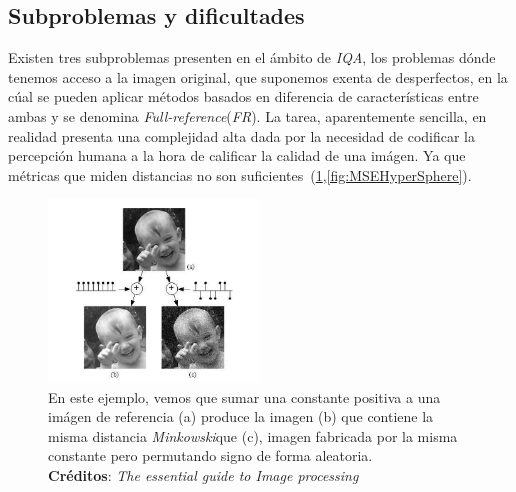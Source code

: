 
\subsection{Subproblemas y dificultades}
Existen tres subproblemas presenten en el ámbito de \emph{IQA}, los problemas 
dónde tenemos acceso a la imagen original, que suponemos exenta de desperfectos, 
en la cúal se pueden aplicar métodos basados en diferencia de características 
entre ambas y se denomina \emph{Full-reference}(\emph{FR}). 
La tarea, aparentemente sencilla, en realidad presenta una complejidad alta dada por 
la necesidad de codificar la percepción humana a la hora de calificar la calidad 
de una imágen. Ya que métricas que miden distancias no son suficientes~(\ref{fig:FailureMinkowskiMetric},\ref{fig:MSEHyperSphere}).
\begin{figure}[H]
  \begin{center}
    \includegraphics[width=0.5\textwidth]{imagenes/failure_minkowski_metric.png}
  \end{center}
  \caption{En este ejemplo, vemos que sumar una constante positiva a una imágen de 
    referencia (a) produce la imagen (b) que contiene la misma distancia \emph{Minkowski}\footnotemark[1]
  que (c), imagen fabricada por la misma constante pero permutando signo de forma aleatoria. \\\hspace{\textwidth}
\textbf{Créditos}: \emph{The essential guide to Image processing}~\cite{MinkowskiFailure}}
  \label{fig:FailureMinkowskiMetric}
\end{figure}
